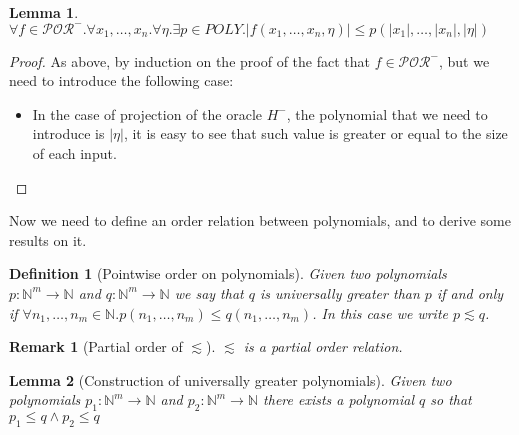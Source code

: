 \documentclass[10pt]{amsart}
\newcommand{\POR}{\mathcal{POR}}
\newcommand{\vone}{x}
\newcommand{\NN}{\mathbb{N}}
\newtheorem{defn}{Definition}
\newtheorem{lemma}{Lemma}
\newtheorem{remark}{Remark}
\begin{document}
\begin{lemma}
\label{lemma:sizeofpor-}
$\forall f \in \POR^-.\forall \vone_1,\ldots, \vone_n.\forall\eta.\exists p \in POLY. |f(\vone_1, \ldots, \vone_n, \eta)| \le p(|\vone_1|, \ldots, |\vone_n|, |\eta|)$
\end{lemma}
\begin{proof}
As above, by induction on the proof of the fact that $f \in \POR^-$, but we need to introduce the following case:
\begin{itemize}
\item In the case of projection of the oracle $H^-$, the polynomial that we need to introduce is $|\eta|$, it is easy to see that such value is greater or equal to the size of each input.
\end{itemize}
\end{proof}

Now we need to define an order relation between polynomials, and to derive some results on it.

\begin{defn}[Pointwise order on polynomials]
Given two polynomials $p: \NN^m \to \NN$ and $q: \NN^m \to \NN$ we say that $q$ is \emph{universally greater} than $p$ if and only if $\forall n_1, \ldots, n_m \in \NN.p(n_1, \ldots, n_m) \le q(n_1, \ldots, n_m)$. In this case we write $p \lesssim q$.
\end{defn}

\begin{remark}[Partial order of $\lesssim$]
$\lesssim$ is a partial order relation.
\end{remark}

\begin{lemma}[Construction of universally greater polynomials]
\label{lemma:greaterpoly}
Given two polynomials $p_1: \NN^m \to \NN$ and $p_2: \NN^m \to \NN$ there exists a polynomial $q$ so that $p_1 \le q\land p_2 \le q$
\end{lemma}
\end{document}
